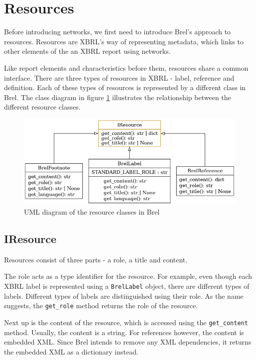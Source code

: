 \section{Resources}
\label{sec:api_resources}

Before introducing networks, we first need to introduce Brel's approach to resources.
Resources are XBRL's way of representing metadata, 
which links to other elements of the an XBRL report using networks.

Like report elements and characteristics before them, resources share a common interface.
There are three types of resources in XBRL - label, reference and definition.
Each of these types of resources is represented by a different class in Brel.
The class diagram in figure \ref{fig:brel_resource_classes} illustrates the relationship between the different resource classes.

\begin{figure}[H]
    \centering
    \includegraphics[width=\textwidth]{images/brel_resource_classes.png}
    \caption{UML diagram of the resource classes in Brel}
    \label{fig:brel_resource_classes}
\end{figure}

\subsection{IResource}

Resources consist of three parts - a role, a title and content.

The role acts as a type identifier for the resource.
For example, even though each XBRL label is represented using a \texttt{BrelLabel} object, 
there are different types of labels.
Different types of labels are distinguished using their role.
As the name suggests, the \texttt{get\_role} method returns the role of the resource. 

Next up is the content of the resource, which is accessed using the \texttt{get\_content} method.
Usually, the content is a string.
For references however, the content is embedded XML.
Since Brel intends to remove any XML dependencies, it returns the embedded XML as a dictionary instead. 

